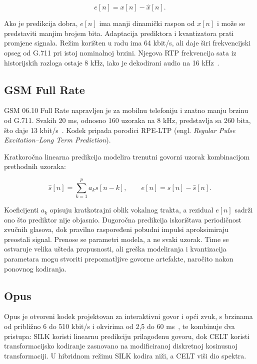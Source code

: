 \begin{equation}
e[n]=x[n]-\widehat{x}[n].
\end{equation}

Ako je predikcija dobra, $e[n]$ ima manji dinamički raspon od $x[n]$ i može se predstaviti manjim brojem bita. Adaptacija prediktora i kvantizatora prati promjene signala. Režim korišten u radu ima 64 kbit/s, ali daje širi frekvencijski opseg od G.711 pri istoj nominalnoj brzini. Njegova RTP frekvencija sata iz historijskih razloga ostaje 8 kHz, iako je dekodirani audio na 16 kHz~\cite{rfc3551}.

\subsection{GSM Full Rate}

GSM 06.10 Full Rate napravljen je za mobilnu telefoniju i znatno manju brzinu od G.711. Svakih 20 ms, odnosno 160 uzoraka na 8 kHz, predstavlja sa 260 bita, što daje 13 kbit/s~\cite{etsi-gsm-fr}. Kodek pripada porodici RPE-LTP (engl. \emph{Regular Pulse Excitation--Long Term Prediction}).

Kratkoročna linearna predikcija modelira trenutni govorni uzorak kombinacijom prethodnih uzoraka:

\begin{equation}
\widehat{s}[n]=\sum_{k=1}^{p}a_k s[n-k], \qquad e[n]=s[n]-\widehat{s}[n].
\end{equation}

Koeficijenti $a_k$ opisuju kratkotrajni oblik vokalnog trakta, a rezidual $e[n]$ sadrži ono što prediktor nije objasnio. Dugoročna predikcija iskorištava periodičnost zvučnih glasova, dok pravilno raspoređeni pobudni impulsi aproksimiraju preostali signal. Prenose se parametri modela, a ne svaki uzorak. Time se ostvaruje velika ušteda propusnosti, ali greška modeliranja i kvantizacija parametara mogu stvoriti prepoznatljive govorne artefakte, naročito nakon ponovnog kodiranja.

\subsection{Opus}

Opus je otvoreni kodek projektovan za interaktivni govor i opći zvuk, s brzinama od približno 6 do 510 kbit/s i okvirima od 2,5 do 60 ms~\cite{rfc6716}, te kombinuje dva pristupa: SILK koristi linearnu predikciju prilagođenu govoru, dok CELT koristi transformacijsko kodiranje zasnovano na modificiranoj diskretnoj kosinusnoj transformaciji. U hibridnom režimu SILK kodira niži, a CELT viši dio spektra.

